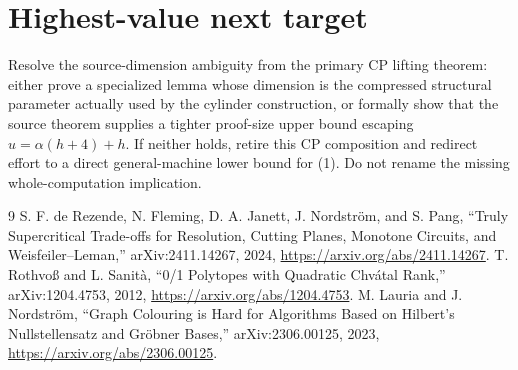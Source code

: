\documentclass[11pt]{article}
\begin{document}
\section{Highest-value next target}
Resolve the source-dimension ambiguity from the primary CP lifting theorem:
either prove a specialized lemma whose dimension is the compressed structural
parameter actually used by the cylinder construction, or formally show that
the source theorem supplies a tighter proof-size upper bound escaping
\(u=\alpha(h+4)+h\).  If neither holds, retire this CP composition and redirect
effort to a direct general-machine lower bound for (1).  Do not rename the
missing whole-computation implication.

\begin{thebibliography}{9}
S. F. de Rezende, N. Fleming, D. A. Janett, J. Nordstr\"om, and S. Pang,
``Truly Supercritical Trade-offs for Resolution, Cutting Planes, Monotone
Circuits, and Weisfeiler--Leman,'' arXiv:2411.14267, 2024,
\url{https://arxiv.org/abs/2411.14267}.
T. Rothvo\ss{} and L. Sanit\`a, ``0/1 Polytopes with Quadratic Chv\'atal
Rank,'' arXiv:1204.4753, 2012,
\url{https://arxiv.org/abs/1204.4753}.
M. Lauria and J. Nordstr\"om, ``Graph Colouring is Hard for Algorithms Based
on Hilbert's Nullstellensatz and Gr\"obner Bases,'' arXiv:2306.00125, 2023,
\url{https://arxiv.org/abs/2306.00125}.
\end{thebibliography}
\end{document}
